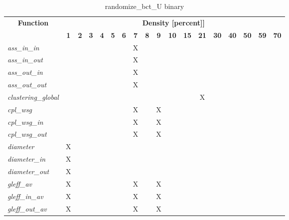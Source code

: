 \begin{table}[h] \centering \begin{tabular}{|l|c|c|c|c|c|c|c|c|c|c|c|c|c|c|c|c|c|} \hline\multicolumn{1}{|c|}{\textbf{\large{Function}}} & \multicolumn{17}{c|}{\large{\textbf{Density [percent]]}}}\\\cline{2-18}  & \textbf{1} &  \textbf{2} &  \textbf{3} &  \textbf{4} &  \textbf{5} &  \textbf{6} &  \textbf{7} &  \textbf{8} &  \textbf{9} &  \textbf{10} &  \textbf{15} &  \textbf{21} &  \textbf{30} &  \textbf{40} &  \textbf{50} &  \textbf{59} &  \textbf{70} \\ \hline   \textit{ass\_in\_in} &   &   &   &   &   &   & X &   &   &   &   &   &   &   &   &   &   \\ \hline  \textit{ass\_in\_out} &   &   &   &   &   &   & X &   &   &   &   &   &   &   &   &   &   \\ \hline  \textit{ass\_out\_in} &   &   &   &   &   &   & X &   &   &   &   &   &   &   &   &   &   \\ \hline  \textit{ass\_out\_out} &   &   &   &   &   &   & X &   &   &   &   &   &   &   &   &   &   \\ \hline  \textit{clustering\_global} &   &   &   &   &   &   &   &   &   &   &   & X &   &   &   &   &   \\ \hline  \textit{cpl\_wsg} &   &   &   &   &   &   & X &   & X &   &   &   &   &   &   &   &   \\ \hline  \textit{cpl\_wsg\_in} &   &   &   &   &   &   & X &   & X &   &   &   &   &   &   &   &   \\ \hline  \textit{cpl\_wsg\_out} &   &   &   &   &   &   & X &   & X &   &   &   &   &   &   &   &   \\ \hline  \textit{diameter} & X &   &   &   &   &   &   &   &   &   &   &   &   &   &   &   &   \\ \hline  \textit{diameter\_in} & X &   &   &   &   &   &   &   &   &   &   &   &   &   &   &   &   \\ \hline  \textit{diameter\_out} & X &   &   &   &   &   &   &   &   &   &   &   &   &   &   &   &   \\ \hline  \textit{gleff\_av} & X &   &   &   &   &   & X &   & X &   &   &   &   &   &   &   &   \\ \hline  \textit{gleff\_in\_av} & X &   &   &   &   &   & X &   & X &   &   &   &   &   &   &   &   \\ \hline  \textit{gleff\_out\_av} & X &   &   &   &   &   & X &   & X &   &   &   &   &   &   &   &   \\ \hline \end{tabular}\caption{randomize\_bct\_U binary}\label{tab:my_label} \end{table}